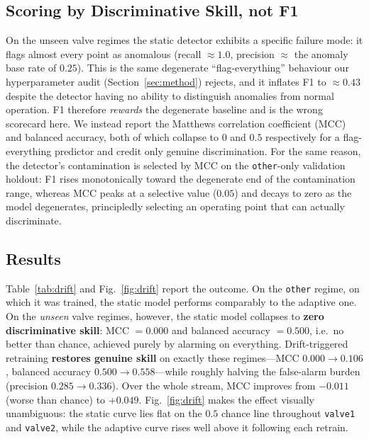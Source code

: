 \documentclass[conference]{IEEEtran}
\begin{document}
\subsection{Scoring by Discriminative Skill, not F1}
On the unseen valve regimes the static detector exhibits a specific failure
mode: it flags almost every point as anomalous (recall $\approx 1.0$, precision
$\approx$ the anomaly base rate of $0.25$). This is the same degenerate
``flag-everything'' behaviour our hyperparameter audit (Section~\ref{sec:method})
rejects, and it inflates F1 to $\approx 0.43$ despite the detector having no
ability to distinguish anomalies from normal operation. F1 therefore
\emph{rewards} the degenerate baseline and is the wrong scorecard here. We
instead report the Matthews correlation coefficient (MCC) and balanced accuracy,
both of which collapse to $0$ and $0.5$ respectively for a flag-everything
predictor and credit only genuine discrimination. For the same reason, the
detector's contamination is selected by MCC on the \texttt{other}-only
validation holdout: F1 rises monotonically toward the degenerate end of the
contamination range, whereas MCC peaks at a selective value ($0.05$) and decays
to zero as the model degenerates, principledly selecting an operating point that
can actually discriminate.

\subsection{Results}
Table~\ref{tab:drift} and Fig.~\ref{fig:drift} report the outcome. On the
\texttt{other} regime, on which it was trained, the static model performs
comparably to the adaptive one. On the \emph{unseen} valve regimes, however, the
static model collapses to \textbf{zero discriminative skill}: MCC $=0.000$ and
balanced accuracy $=0.500$, i.e.\ no better than chance, achieved purely by
alarming on everything. Drift-triggered retraining \textbf{restores genuine
skill} on exactly these regimes---MCC $0.000 \rightarrow 0.106$, balanced
accuracy $0.500 \rightarrow 0.558$---while roughly halving the false-alarm
burden (precision $0.285 \rightarrow 0.336$). Over the whole stream, MCC
improves from $-0.011$ (worse than chance) to $+0.049$. Fig.~\ref{fig:drift}
makes the effect visually unambiguous: the static curve lies flat on the $0.5$
chance line throughout \texttt{valve1} and \texttt{valve2}, while the adaptive
curve rises well above it following each retrain.
\end{document}
